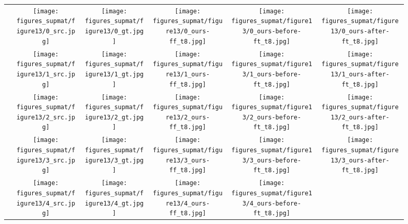 \documentclass[10pt,twocolumn,letterpaper]{article}
\begin{document}
\begin{figure*}
    \centering    
    \setlength{\wid}{0.179\textwidth}
    \addtolength{\tabcolsep}{-4pt}
    \begin{tabular}{m{0.6cm}c:cccc}
        &
        \texttt{[image: figures\_supmat/figure13/0\_src.jpg]}
        \;&\;
        \texttt{[image: figures\_supmat/figure13/0\_gt.jpg]}&
        \texttt{[image: figures\_supmat/figure13/0\_ours-ff\_t8.jpg]}&
        \texttt{[image: figures\_supmat/figure13/0\_ours-before-ft\_t8.jpg]}&
        \texttt{[image: figures\_supmat/figure13/0\_ours-after-ft\_t8.jpg]}\\
        &
        \texttt{[image: figures\_supmat/figure13/1\_src.jpg]}
        \;&\;
        \texttt{[image: figures\_supmat/figure13/1\_gt.jpg]}&
        \texttt{[image: figures\_supmat/figure13/1\_ours-ff\_t8.jpg]}&
        \texttt{[image: figures\_supmat/figure13/1\_ours-before-ft\_t8.jpg]}&
        \texttt{[image: figures\_supmat/figure13/1\_ours-after-ft\_t8.jpg]}\\
        &
        \texttt{[image: figures\_supmat/figure13/2\_src.jpg]}
        \;&\;
        \texttt{[image: figures\_supmat/figure13/2\_gt.jpg]}&
        \texttt{[image: figures\_supmat/figure13/2\_ours-ff\_t8.jpg]}&
        \texttt{[image: figures\_supmat/figure13/2\_ours-before-ft\_t8.jpg]}&
        \texttt{[image: figures\_supmat/figure13/2\_ours-after-ft\_t8.jpg]}\\
        &
        \texttt{[image: figures\_supmat/figure13/3\_src.jpg]}
        \;&\;
        \texttt{[image: figures\_supmat/figure13/3\_gt.jpg]}&
        \texttt{[image: figures\_supmat/figure13/3\_ours-ff\_t8.jpg]}&
        \texttt{[image: figures\_supmat/figure13/3\_ours-before-ft\_t8.jpg]}&
        \texttt{[image: figures\_supmat/figure13/3\_ours-after-ft\_t8.jpg]}\\
        &
        \texttt{[image: figures\_supmat/figure13/4\_src.jpg]}
        \;&\;
        \texttt{[image: figures\_supmat/figure13/4\_gt.jpg]}&
        \texttt{[image: figures\_supmat/figure13/4\_ours-ff\_t8.jpg]}&
        \texttt{[image: figures\_supmat/figure13/4\_ours-before-ft\_t8.jpg]}&

\end{tabular}
\end{figure*}
\end{document}
